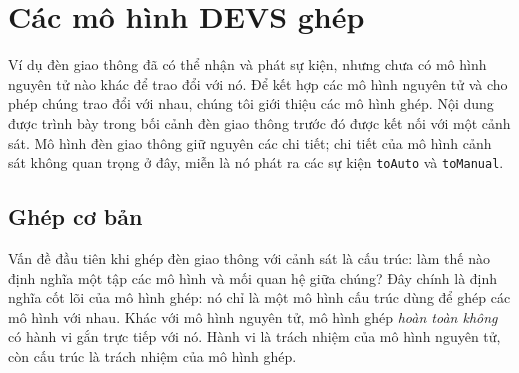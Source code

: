 \section{Các mô hình DEVS ghép}
Ví dụ đèn giao thông đã có thể nhận và phát sự kiện, nhưng chưa có mô hình nguyên tử nào khác để trao đổi với nó. Để kết hợp các mô hình nguyên tử và cho phép chúng trao đổi với nhau, chúng tôi giới thiệu các mô hình ghép. Nội dung được trình bày trong bối cảnh đèn giao thông trước đó được kết nối với một cảnh sát. Mô hình đèn giao thông giữ nguyên các chi tiết; chi tiết của mô hình cảnh sát không quan trọng ở đây, miễn là nó phát ra các sự kiện \texttt{toAuto} và \texttt{toManual}.

\subsection{Ghép cơ bản}
Vấn đề đầu tiên khi ghép đèn giao thông với cảnh sát là cấu trúc: làm thế nào định nghĩa một tập các mô hình và mối quan hệ giữa chúng? Đây chính là định nghĩa cốt lõi của mô hình ghép: nó chỉ là một mô hình cấu trúc dùng để ghép các mô hình với nhau. Khác với mô hình nguyên tử, mô hình ghép \emph{hoàn toàn không} có hành vi gắn trực tiếp với nó. Hành vi là trách nhiệm của mô hình nguyên tử, còn cấu trúc là trách nhiệm của mô hình ghép.

